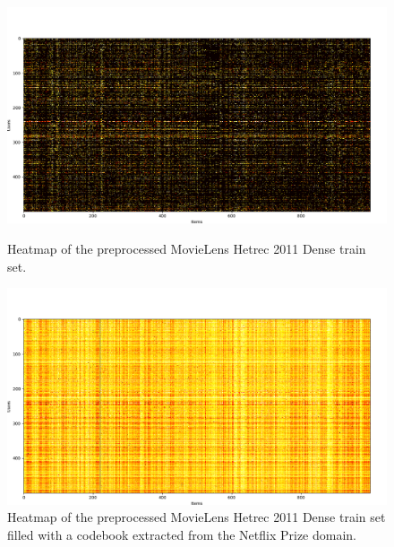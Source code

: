 \begin{figure}[htb]
\centering
\includegraphics[width=\textwidth]{pictures/movielens-target}
\caption{Heatmap of the preprocessed MovieLens Hetrec 2011 Dense train set.}
\includegraphics[width=\textwidth]{pictures/movielens-target-filled}
\caption{Heatmap of the preprocessed MovieLens Hetrec 2011 Dense train set filled with a codebook extracted from the Netflix Prize domain.}
\end{figure}


